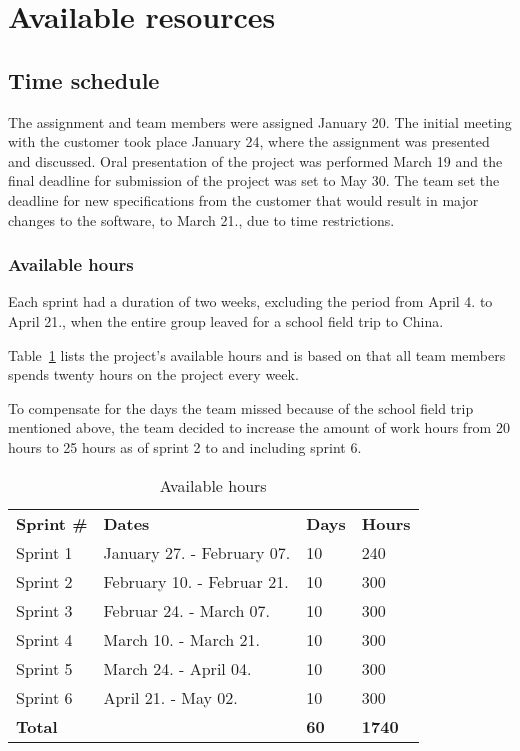 \section{Available resources}
\subsection{Time schedule}
The assignment and team members were assigned January 20. The initial meeting with the customer took place January 24, where the assignment was presented and discussed. Oral presentation of the project was performed March 19 and the final deadline for submission of the project was set to May 30. The team set the deadline for new specifications from the customer that would result in major changes to the software, to March 21., due to time restrictions.

\subsubsection{Available hours}
Each sprint had a duration of two weeks, excluding the period from April 4. to April 21., when the entire group leaved for a school field trip to China.

Table~\ref{tab:availHours} lists the project's available hours and is based on that all team members spends twenty hours on the project every week.

To compensate for the days the team missed because of the school field trip mentioned above, the team decided to increase the amount of work hours from 20 hours to 25 hours as of sprint 2 to and including sprint 6.

\begin{table}[H]
\centering
{}
\begin{tabular}{|l|l|l|l|}
\hline
\textbf{Sprint \#} & \textbf{Dates} & \textbf{Days} & \textbf{Hours}\\
Sprint 1& January 27. - February 07. & 10  & 240 \\
Sprint 2 & February 10. - Februar 21. &10  & 300 \\
Sprint 3 & Februar 24. - March 07. &10 & 300 \\
Sprint 4 & March 10. - March 21. &10  &300 \\
Sprint 5 & March 24. - April 04. &10&  300 \\
Sprint 6 & April 21. - May 02. &10  &300 \\
\textbf{Total}&& \textbf{60}&  \textbf{1740}\\\hline
\end{tabular}
\caption{Available hours}
\label{tab:availHours}
\end{table}

